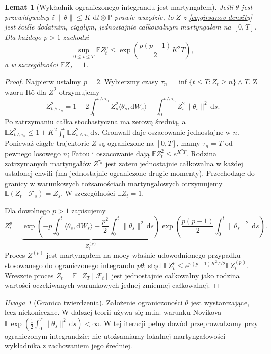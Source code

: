 \documentclass[11pt,a4paper,oneside]{report}
\numberwithin{equation}{chapter}
\theoremstyle{plain}
\newtheorem{lemat}[twierdzenie]{Lemat}
\theoremstyle{definition}
\theoremstyle{remark}
\newtheorem{uwaga}{Uwaga}[chapter]
\newcommand{\Prob}{\mathbb{P}}
\newcommand{\E}{\mathbb{E}}
\newcommand{\calF}{\mathcal{F}}
\newcommand{\dd}{\mathrm{d}}
\newcommand{\norm}[1]{\lVert #1\rVert}
\begin{document}
\begin{lemat}[Wykładnik ograniczonego integrandu jest martyngałem]\label{lem:volIII:08:02}
\label{lem:bounded-exponential}
Jeśli $\theta$ jest przewidywalny i
$\norm{\theta}\le K$ $\dd t\otimes\Prob$-prawie wszędzie,
to $Z$ z \eqref{eq:girsanov-density} jest ściśle dodatnim,
ciągłym, jednostajnie całkowalnym martyngałem na $[0,T]$.
Dla każdego $p>1$ zachodzi
\[
\sup_{0\le t\le T}\E Z_t^p
\le\exp\left(\frac{p(p-1)}2 K^2T\right),
\tag{8.4}\label{eq:z-moments}
\]
a w szczególności $\E Z_T=1$.
\end{lemat}
\begin{proof}
Najpierw ustalmy $p=2$. Wybierzmy czasy
$\tau_n=\inf\{t\le T:Z_t\ge n\}\wedge T$.
Z wzoru Itô dla $Z^2$ otrzymujemy
\[
Z_{t\wedge\tau_n}^2
=1-2\int_0^{t\wedge\tau_n}Z_s^2\langle\theta_s,\dd W_s\rangle
+\int_0^{t\wedge\tau_n}Z_s^2\norm{\theta_s}^2\,\dd s.
\]
Po zatrzymaniu całka stochastyczna ma zerową średnią,
a $\E Z_{t\wedge\tau_n}^2\le
1+K^2\int_0^t\E Z_{s\wedge\tau_n}^2\,\dd s$.
Gronwall daje oszacowanie jednostajne w $n$.
Ponieważ ciągłe trajektorie $Z$ są ograniczone na
$[0,T]$, mamy $\tau_n=T$ od pewnego losowego $n$;
Fatou i oszacowanie dają $\E Z_t^2\le e^{K^2T}$.
Rodzina zatrzymanych martyngałów $Z^{\tau_n}$
jest zatem jednostajnie całkowalna w każdej ustalonej
chwili (ma jednostajnie ograniczone drugie momenty).
Przechodząc do granicy w warunkowych tożsamościach
martyngałowych otrzymujemy $\E(Z_t\mid\calF_s)=Z_s$.
W szczególności $\E Z_t=1$.

Dla dowolnego $p>1$ zapisujemy
\[
Z_t^p=\underbrace{\exp\left(
-p\int_0^t\langle\theta_s,\dd W_s\rangle
-\frac{p^2}2\int_0^t\norm{\theta_s}^2\,\dd s\right)}_{Z_t^{(p)}}
\exp\left(\frac{p(p-1)}2\int_0^t\norm{\theta_s}^2\,\dd s\right).
\]
Proces $Z^{(p)}$ jest martyngałem na mocy właśnie
udowodnionego przypadku stosowanego do ograniczonego
integrandu $p\theta$; stąd
$\E Z_t^p\le e^{p(p-1)K^2T/2}\E Z_t^{(p)}$.
Wreszcie proces $Z_t=\E[Z_T\mid\calF_t]$ jest
jednostajnie całkowalny jako rodzina wartości oczekiwanych
warunkowych jednej zmiennej całkowalnej.
\end{proof}

\begin{uwaga}[Granica twierdzenia]
Założenie ograniczoności $\theta$ jest wystarczające,
lecz niekonieczne. W dalszej teorii używa się m.in.
warunku Novikova
$\E\exp(\frac12\int_0^T\norm{\theta_s}^2\,\dd s)<\infty$.
W tej iteracji pełny dowód przeprowadzamy przy
ograniczonym integrandzie; nie utożsamiamy lokalnej
martyngałowości wykładnika z zachowaniem jego średniej.
\end{uwaga}
\end{document}
